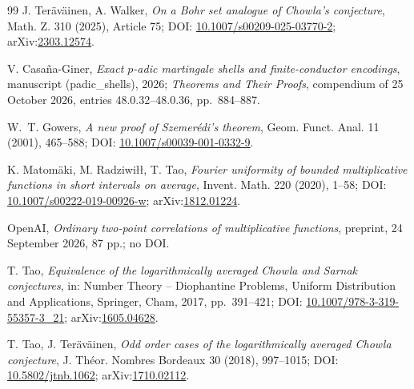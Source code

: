 \documentclass[preprint,12pt]{elsarticle}
\numberwithin{equation}{section}
\theoremstyle{plain}
\theoremstyle{definition}
\theoremstyle{definition}
\theoremstyle{remark}
\begin{document}
\begin{thebibliography}{99}
J. Ter\"av\"ainen, A. Walker,
\textit{On a Bohr set analogue of Chowla's conjecture},
Math. Z. 310 (2025), Article 75; DOI: \href{https://doi.org/10.1007/s00209-025-03770-2}{10.1007/s00209-025-03770-2};
arXiv:\href{https://arxiv.org/abs/2303.12574}{2303.12574}.

V. Casa\~na-Giner,
\textit{Exact $p$-adic martingale shells and finite-conductor encodings},
manuscript (padic\_shells), 2026; \textit{Theorems and Their Proofs}, compendium of 25 October 2026, entries 48.0.32--48.0.36, pp.~884--887.

W.~T. Gowers,
\textit{A new proof of Szemer\'edi's theorem},
Geom. Funct. Anal. 11 (2001), 465--588;
DOI: \href{https://doi.org/10.1007/s00039-001-0332-9}{10.1007/s00039-001-0332-9}.

K. Matom\"aki, M. Radziwi{\l}{\l}, T. Tao,
\textit{Fourier uniformity of bounded multiplicative functions in short intervals on average},
Invent. Math. 220 (2020), 1--58;
DOI: \href{https://doi.org/10.1007/s00222-019-00926-w}{10.1007/s00222-019-00926-w};
arXiv:\href{https://arxiv.org/abs/1812.01224}{1812.01224}.

OpenAI,
\textit{Ordinary two-point correlations of multiplicative functions},
preprint, 24 September 2026, 87 pp.; no DOI.

T. Tao,
\textit{Equivalence of the logarithmically averaged Chowla and Sarnak conjectures},
in: Number Theory -- Diophantine Problems, Uniform Distribution and Applications,
Springer, Cham, 2017, pp.~391--421;
DOI: \href{https://doi.org/10.1007/978-3-319-55357-3_21}{10.1007/978-3-319-55357-3\_21};
arXiv:\href{https://arxiv.org/abs/1605.04628}{1605.04628}.

T. Tao, J. Ter\"av\"ainen,
\textit{Odd order cases of the logarithmically averaged Chowla conjecture},
J. Th\'eor. Nombres Bordeaux 30 (2018), 997--1015;
DOI: \href{https://doi.org/10.5802/jtnb.1062}{10.5802/jtnb.1062};
arXiv:\href{https://arxiv.org/abs/1710.02112}{1710.02112}.

\end{thebibliography}
\end{document}
